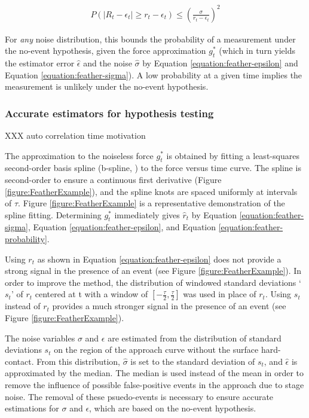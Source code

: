 \documentclass[%
  aip,12pt,tightenlines,
  amsthm,
 amsmath,amssymb
]{article}
\newcommand{\eqlab}[2]{
\begin{equation}
\label{equation:#2}
\begin{split}
#1
\end{split}
\end{equation}
}
\newcommand{\fRef}[1]{Figure \ref{figure:#1}}
\newcommand{\eRef}[1]{Equation \ref{equation:#1}}
\newcommand{\pl}[0]{\vspace{6pt}}
\begin{document}
\eqlab{ P( |R_t-\epsilon_t| \ge r_t-\epsilon_t ) \le
 (\frac{\sigma}{r_t-\epsilon_t})^2 }{feather-probability}


For \emph{any} noise distribution, this bounds the probability of a measurement under the no-event hypothesis, given the force approximation $g^{*}_t$ (which in turn yields the estimator error $\hat{\epsilon}$ and the noise $\hat{\sigma}$ by \eRef{feather-epsilon} and \eRef{feather-sigma}). A low probability at a given time implies the measurement is unlikely under the no-event hypothesis. \pl

\subsubsection{Accurate estimators for hypothesis testing}

XXX auto correlation time motivation \pl 

The approximation to the noiseless force $g^{*}_t$ is obtained by fitting a least-squares second-order basis spline (b-spline, ) to the force versus time curve. The spline is second-order to ensure a continuous first derivative (\fRef{FeatherExample}), and the spline knots are spaced uniformly at intervals of $\tau$. \fRef{FeatherExample} is a representative demonstration of the spline fitting. Determining  $g^{*}_t$ immediately gives $\hat{r}_t$ by  \eRef{feather-sigma}, \eRef{feather-epsilon}, and \eRef{feather-probability}. \pl

Using $r_t$ as shown in \eRef{feather-epsilon} does not provide a strong signal in the presence of an event (see \fRef{FeatherExample}). In order to improve the method, the distribution of windowed standard deviations `$s_t$' of $r_t$ centered at t with a window of $[-\frac{\tau}{2},\frac{\tau}{2}]$ was used in place of $r_t$. Using $s_t$ instead of $r_t$ provides a much stronger signal in the presence of an event (see \fRef{FeatherExample}).  \pl

The noise variables $\sigma$ and $\epsilon$ are estimated from the distribution of standard deviations $s_t$ on the region of the approach curve without the surface hard-contact. From this distribution, $\hat{\sigma}$ is set to the standard deviation of $s_t$, and $\hat{\epsilon}$ is approximated by the median. The median is used instead of the mean in order to remove the influence of possible false-positive events in the approach due to stage noise. The removal of these psuedo-events is necessary to ensure accurate estimations for $\sigma$ and $\epsilon$, which are based on the no-event hypothesis.
\end{document}
